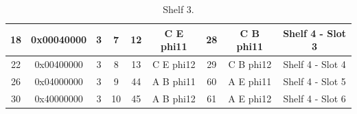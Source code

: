 \documentclass[11pt,letterpaper]{article}
\begin{document}
\begin{table}[h]
\begin{tabular}{|c|c|c|c|c|c|c|c|c|}
18                     & 0x00040000            & 3                          & 7                         & 12                            & C E phi11                     & 28                            & C B phi11                     & Shelf 4 - Slot 3             \\ \hline
22                     & 0x00400000            & 3                          & 8                         & 13                            & C E phi12                     & 29                            & C B phi12                     & Shelf 4 - Slot 4             \\ \hline
26                     & 0x04000000            & 3                          & 9                         & 44                            & A B phi11                     & 60                            & A E phi11                     & Shelf 4 - Slot 5             \\ \hline
30                     & 0x40000000            & 3                          & 10                        & 45                            & A B phi12                     & 61                            & A E phi12                     & Shelf 4 - Slot 6             \\ \hline
\end{tabular}
\caption{Shelf 3.}
\label{tab:shelf3}
\end{table}
\end{document}
